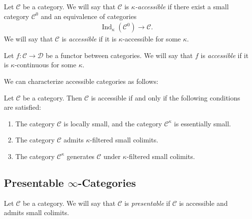 \documentclass[a4paper,dvipdfmx,11pt,reqno]{amsart}
\DeclareMathOperator{\Ind}{Ind}
\newcommand{\C}{\mathcal{C}}
\newcommand{\D}{\mathcal{D}}
\begin{document}
\begin{definition}
  Let $\C$ be a category.
  We will say that $\C$ is \textit{$\kappa$-accessible} if there exist a small category $\C^0$ and an equivalence of categories
  \begin{align*}
    \Ind_{\kappa}(\C^0) \to \C.
  \end{align*}
  We will say that $\C$ is \textit{accessible} if it is $\kappa$-accessible for some $\kappa$. 
\end{definition}

\begin{definition}
  Let $f : \C \to \D$ be a functor between categories.
  We will say that $f$ is \textit{accessible} if it is $\kappa$-continuous for some $\kappa$.
\end{definition}

We can characterize accessible categories as follows:

\begin{proposition}
  Let $\C$ be a category.
  Then $\C$ is accessible if and only if the following conditions are satisfied:
  \begin{enumerate}
    \item The category $\C$ is locally small, and the category $\C^{\kappa}$ is essentially small.
    \item The category $\C$ admits $\kappa$-filtered small colimits.
    \item The category $\C^{\kappa}$ generates $\C$ under $\kappa$-filtered small colimits.
  \end{enumerate}
\end{proposition}

\subsection{Presentable \texorpdfstring{$\infty$}{infty}-Categories}

\begin{definition}
  Let $\C$ be a category.
  We will say that $\C$ is \textit{presentable} if $\C$ is accessible and admits small colimits.
\end{definition}
\end{document}
